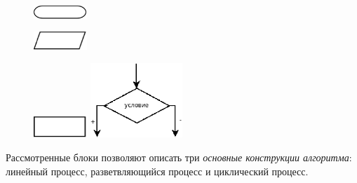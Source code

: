    \begin{figure}%
   \begin{floatrow}[4]
   {\includegraphics[width=0.18\textwidth,keepaspectratio]{img/ris_3_1}}%

   {\includegraphics[width=0.18\textwidth,keepaspectratio]{img/ris_3_2}}%

   {\includegraphics[width=0.18\textwidth,keepaspectratio]{img/ris_3_3}}%
   {\includegraphics[width=0.31\textwidth,keepaspectratio]{img/ris_3_4}}%
   \end{floatrow}
   \end{figure}%

Рассмотренные блоки позволяют описать три \emph{основные конструкции
алгоритма}: линейный процесс, разветвляющийся процесс и циклический процесс.


